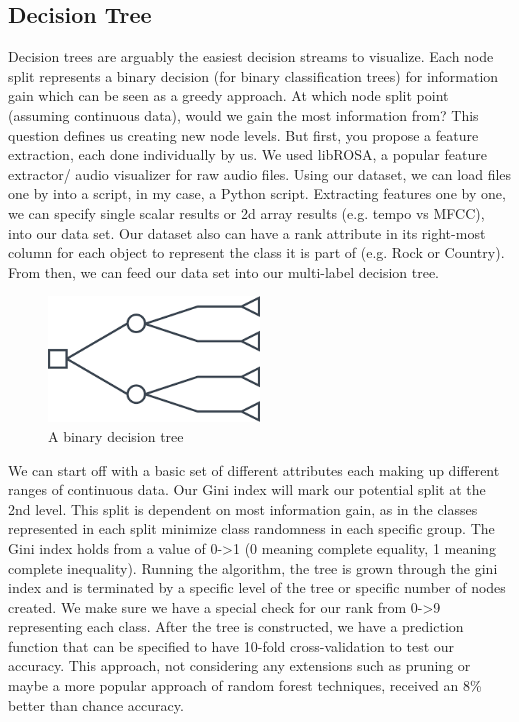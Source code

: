 \documentclass[acmtog, authorversion]{acmart}
\begin{document}
\subsection{Decision Tree}
Decision trees are arguably the easiest decision streams to visualize. Each node split represents a binary decision (for binary classification trees) for information gain which can be seen as a greedy approach. At which node split point (assuming continuous data), would we gain the most information from? This question defines us creating new node levels. But first, you propose a feature extraction, each done individually by us. We used libROSA, a popular feature extractor/ audio visualizer for raw audio files. Using our dataset, we can load files one by into a script, in my case, a Python script. Extracting features one by one, we can specify single scalar results or 2d array results (e.g. tempo vs MFCC), into our data set. Our dataset also can have a rank attribute in its right-most column for each object to represent the class it is part of (e.g. Rock or Country). From then, we can feed our data set into our multi-label decision tree.
\begin{figure}[h!]
  \centering
  \includegraphics[width=0.5\textwidth]{decisiontree.png}
  \caption{A binary decision tree}
  \end{figure}

We can start off with a basic set of different attributes each making up different ranges of continuous data. Our Gini index will mark our potential split at the 2nd level. This split is dependent on most information gain, as in the classes represented in each split minimize class randomness in each specific group. The Gini index holds from a value of 0->1 (0 meaning complete equality, 1 meaning complete inequality). Running the algorithm, the tree is grown through the gini index and is terminated by a specific level of the tree or specific number of nodes created. We make sure we have a special check for our rank from 0->9 representing each class. After the tree is constructed, we have a prediction function that can be specified to have 10-fold cross-validation to test our accuracy. This approach, not considering any extensions such as pruning or maybe a more popular approach of random forest techniques, received an 8\% better than chance accuracy. 
\end{document}
